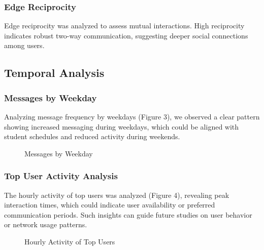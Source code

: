 \subsubsection{Edge Reciprocity}
Edge reciprocity was analyzed to assess mutual interactions. High reciprocity indicates robust two-way communication, suggesting deeper social connections among users.

\subsection{Temporal Analysis}

\subsubsection{Messages by Weekday}
Analyzing message frequency by weekdays (Figure 3), we observed a clear pattern showing increased messaging during weekdays, which could be aligned with student schedules and reduced activity during weekends.

\begin{figure}[h]
\centering
\caption{Messages by Weekday}
\label{fig:messages_weekday}
\end{figure}

\subsubsection{Top User Activity Analysis}
The hourly activity of top users was analyzed (Figure 4), revealing peak interaction times, which could indicate user availability or preferred communication periods. Such insights can guide future studies on user behavior or network usage patterns.

\begin{figure}[h]
\centering
\caption{Hourly Activity of Top Users}
\label{fig:hourly_activity}
\end{figure}

